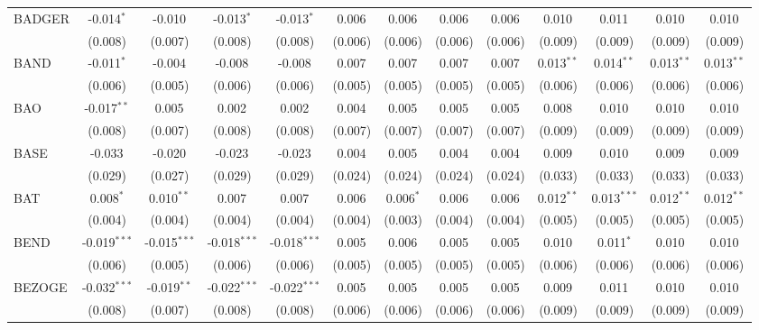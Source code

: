 \begin{table}[!htbp]
\begin{tabular}{@{\extracolsep{5pt}}lcccccccccccc}
 BADGER & -0.014$^{*}$ & -0.010$^{}$ & -0.013$^{*}$ & -0.013$^{*}$ & 0.006$^{}$ & 0.006$^{}$ & 0.006$^{}$ & 0.006$^{}$ & 0.010$^{}$ & 0.011$^{}$ & 0.010$^{}$ & 0.010$^{}$ \\
  & (0.008) & (0.007) & (0.008) & (0.008) & (0.006) & (0.006) & (0.006) & (0.006) & (0.009) & (0.009) & (0.009) & (0.009) \\
 BAND & -0.011$^{*}$ & -0.004$^{}$ & -0.008$^{}$ & -0.008$^{}$ & 0.007$^{}$ & 0.007$^{}$ & 0.007$^{}$ & 0.007$^{}$ & 0.013$^{**}$ & 0.014$^{**}$ & 0.013$^{**}$ & 0.013$^{**}$ \\
  & (0.006) & (0.005) & (0.006) & (0.006) & (0.005) & (0.005) & (0.005) & (0.005) & (0.006) & (0.006) & (0.006) & (0.006) \\
 BAO & -0.017$^{**}$ & 0.005$^{}$ & 0.002$^{}$ & 0.002$^{}$ & 0.004$^{}$ & 0.005$^{}$ & 0.005$^{}$ & 0.005$^{}$ & 0.008$^{}$ & 0.010$^{}$ & 0.010$^{}$ & 0.010$^{}$ \\
  & (0.008) & (0.007) & (0.008) & (0.008) & (0.007) & (0.007) & (0.007) & (0.007) & (0.009) & (0.009) & (0.009) & (0.009) \\
 BASE & -0.033$^{}$ & -0.020$^{}$ & -0.023$^{}$ & -0.023$^{}$ & 0.004$^{}$ & 0.005$^{}$ & 0.004$^{}$ & 0.004$^{}$ & 0.009$^{}$ & 0.010$^{}$ & 0.009$^{}$ & 0.009$^{}$ \\
  & (0.029) & (0.027) & (0.029) & (0.029) & (0.024) & (0.024) & (0.024) & (0.024) & (0.033) & (0.033) & (0.033) & (0.033) \\
 BAT & 0.008$^{*}$ & 0.010$^{**}$ & 0.007$^{}$ & 0.007$^{}$ & 0.006$^{}$ & 0.006$^{*}$ & 0.006$^{}$ & 0.006$^{}$ & 0.012$^{**}$ & 0.013$^{***}$ & 0.012$^{**}$ & 0.012$^{**}$ \\
  & (0.004) & (0.004) & (0.004) & (0.004) & (0.004) & (0.003) & (0.004) & (0.004) & (0.005) & (0.005) & (0.005) & (0.005) \\
 BEND & -0.019$^{***}$ & -0.015$^{***}$ & -0.018$^{***}$ & -0.018$^{***}$ & 0.005$^{}$ & 0.006$^{}$ & 0.005$^{}$ & 0.005$^{}$ & 0.010$^{}$ & 0.011$^{*}$ & 0.010$^{}$ & 0.010$^{}$ \\
  & (0.006) & (0.005) & (0.006) & (0.006) & (0.005) & (0.005) & (0.005) & (0.005) & (0.006) & (0.006) & (0.006) & (0.006) \\
 BEZOGE & -0.032$^{***}$ & -0.019$^{**}$ & -0.022$^{***}$ & -0.022$^{***}$ & 0.005$^{}$ & 0.005$^{}$ & 0.005$^{}$ & 0.005$^{}$ & 0.009$^{}$ & 0.011$^{}$ & 0.010$^{}$ & 0.010$^{}$ \\
  & (0.008) & (0.007) & (0.008) & (0.008) & (0.006) & (0.006) & (0.006) & (0.006) & (0.009) & (0.009) & (0.009) & (0.009) \\

\end{tabular}
\end{table}
